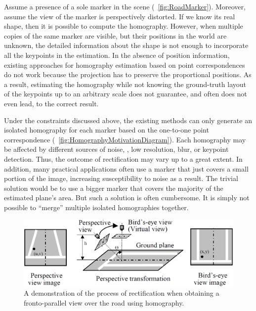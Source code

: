 Assume a presence of a sole marker in the scene (\figtext{}~\ref{fig:RoadMarker}). Moreover, assume the view of the marker is perspectively distorted. If we know its real shape, then it is possible to compute the homography. However, when multiple copies of the same marker are visible, but their positions in the world are unknown, the detailed information about the shape is not enough to incorporate all the keypoints in the estimation. In the absence of position information, existing approaches for homography estimation based on point correspondences do not work because the projection has to preserve the proportional positions. As a result, estimating the homography while not knowing the ground-truth layout of the keypoints up to an arbitrary scale does not guarantee, and often does not even lead, to the correct result.

Under the constraints discussed above, the existing methods can only generate an isolated homography for each marker based on the one-to-one point correspondence (\figtext{}~\ref{fig:HomographyMotivationDiagram}). Each homography may be affected by different sources of noise, \egtext{}, low resolution, blur, or keypoint detection. Thus, the outcome of rectification may vary up to a great extent. In addition, many practical applications often use a marker that just covers a small portion of the image, increasing susceptibility to noise as a result. The trivial solution would be to use a bigger marker that covers the majority of the estimated plane's area. But such a solution is often cumbersome. It is simply not possible to ``merge'' multiple isolated homographies together.

\begin{figure}[t]
    \centerline{\includegraphics[width=0.8\linewidth]{figures/homography/road_rectification.png}}
    \caption[Road rectification]{A demonstration of the process of rectification when obtaining a fronto-parallel view over the road using homography. }
    \label{fig:RoadRectification}
\end{figure}

